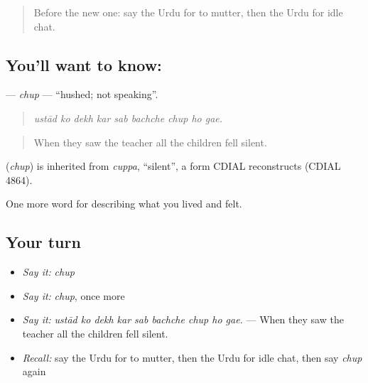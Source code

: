 \label{lesson:UR-C463-chup}



\begin{quote}
Before the new one: say the Urdu for to mutter, then the Urdu for idle chat.
\end{quote}

\subsection*{You'll want to know: }
\textbf{} — \emph{chup} — \textquotedblleft{}hushed; not speaking\textquotedblright{}.

\begin{quote}
        
\end{quote}

\begin{quote}
\emph{ustād ko dekh kar sab bachche chup ho gae.}
\end{quote}

\begin{quote}
When they saw the teacher all the children fell silent.
\end{quote}

\begin{cousinweb}
\textbf{} (\emph{chup}) is inherited from \emph{cuppa}, \textquotedblleft{}silent\textquotedblright{}, a form CDIAL reconstructs (CDIAL 4864).
\end{cousinweb}

\begin{grammarlens}[title={What you've built}]
One more word for describing what you lived and felt.
\end{grammarlens}

\subsection*{Your turn}
\begin{itemize}
\raggedright
  \item \emph{Say it:} \emph{chup}
  \item \emph{Say it:} \emph{chup}, once more
  \item \emph{Say it:} \emph{ustād ko dekh kar sab bachche chup ho gae.} — When they saw the teacher all the children fell silent.
  \item \emph{Recall:} say the Urdu for to mutter, then the Urdu for idle chat, then say \emph{chup} again
\end{itemize}

